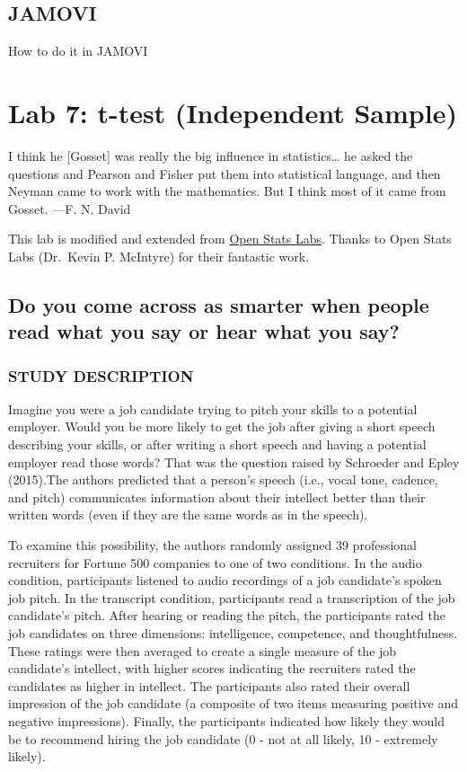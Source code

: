 \documentclass[]{book}
\begin{document}
\section{JAMOVI}\label{jamovi-6}

How to do it in JAMOVI

\chapter{Lab 7: t-test (Independent
Sample)}\label{lab-7-t-test-independent-sample}

{ I think he {[}Gosset{]} was really the big influence in
statistics\ldots{} he asked the questions and Pearson and Fisher put
them into statistical language, and then Neyman came to work with the
mathematics. But I think most of it came from Gosset. ---F. N. David }

This lab is modified and extended from
\href{https://sites.trinity.edu/osl}{Open Stats Labs}. Thanks to Open
Stats Labs (Dr.~Kevin P. McIntyre) for their fantastic work.

\section{Do you come across as smarter when people read what you say or
hear what you
say?}\label{do-you-come-across-as-smarter-when-people-read-what-you-say-or-hear-what-you-say}

\subsection{STUDY DESCRIPTION}\label{study-description-1}

Imagine you were a job candidate trying to pitch your skills to a
potential employer. Would you be more likely to get the job after giving
a short speech describing your skills, or after writing a short speech
and having a potential employer read those words? That was the question
raised by Schroeder and Epley (2015).The authors predicted that a
person's speech (i.e., vocal tone, cadence, and pitch) communicates
information about their intellect better than their written words (even
if they are the same words as in the speech).

To examine this possibility, the authors randomly assigned 39
professional recruiters for Fortune 500 companies to one of two
conditions. In the audio condition, participants listened to audio
recordings of a job candidate's spoken job pitch. In the transcript
condition, participants read a transcription of the job candidate's
pitch. After hearing or reading the pitch, the participants rated the
job candidates on three dimensions: intelligence, competence, and
thoughtfulness. These ratings were then averaged to create a single
measure of the job candidate's intellect, with higher scores indicating
the recruiters rated the candidates as higher in intellect. The
participants also rated their overall impression of the job candidate (a
composite of two items measuring positive and negative impressions).
Finally, the participants indicated how likely they would be to
recommend hiring the job candidate (0 - not at all likely, 10 -
extremely likely).
\end{document}
